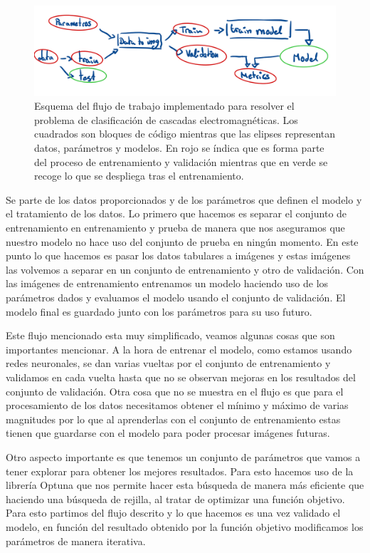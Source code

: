\documentclass[a4paper,12pt,twoside,titlepage]{article}
\begin{document}
\begin{figure}[h!]
  \centering
  \includegraphics[scale=0.49]{flujo_tem.PNG}
  \caption{Esquema del flujo de trabajo implementado para resolver el problema de clasificación de cascadas electromagnéticas. Los cuadrados son bloques de código mientras que las elipses representan datos, parámetros y modelos. En rojo se índica que es forma parte del proceso de entrenamiento y validación mientras que en verde se recoge lo que se despliega tras el entrenamiento.}
  \label{fig:flujo}
\end{figure}

Se parte de los datos proporcionados y de los parámetros que definen el modelo y el tratamiento de los datos. Lo primero que hacemos es separar el conjunto de entrenamiento en entrenamiento y prueba de manera que nos aseguramos que nuestro modelo no hace uso del conjunto de prueba en ningún momento. En este punto lo que hacemos es pasar los datos tabulares a imágenes y estas imágenes las volvemos a separar en un conjunto de entrenamiento y otro de validación. Con las imágenes de entrenamiento entrenamos un modelo haciendo uso de los parámetros dados y evaluamos el modelo usando el conjunto de validación. El modelo final es guardado junto con los parámetros para su uso futuro.

Este flujo mencionado esta muy simplificado, veamos algunas cosas que son importantes mencionar. A la hora de entrenar el modelo, como estamos usando redes neuronales, se dan varias vueltas por el conjunto de entrenamiento y validamos en cada vuelta hasta que no se observan mejoras en los resultados del conjunto de validación. Otra cosa que no se muestra en el flujo es que para el procesamiento de los datos necesitamos obtener el mínimo y máximo de varias magnitudes por lo que al aprenderlas con el conjunto de entrenamiento estas tienen que guardarse con el modelo para poder procesar imágenes futuras.

Otro aspecto importante es que tenemos un conjunto de parámetros que vamos a tener explorar para obtener los mejores resultados. Para esto hacemos uso de la librería Optuna que nos permite hacer esta búsqueda de manera más eficiente que haciendo una búsqueda de rejilla, al tratar de optimizar una función objetivo. Para esto partimos del flujo descrito y lo que hacemos es una vez validado el modelo, en función del resultado obtenido por la función objetivo modificamos los parámetros de manera iterativa.
\end{document}
